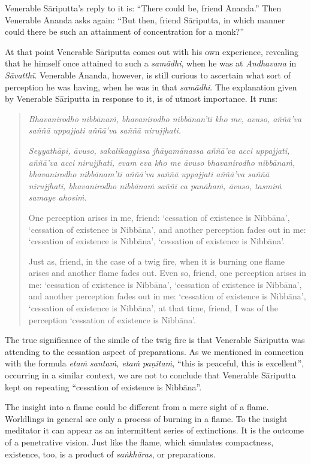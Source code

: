 Venerable Sāriputta's reply to it is: ``There could be, friend Ānanda.'' Then Venerable Ānanda asks again: ``But then, friend Sāriputta, in which manner could there be such an attainment of concentration for a monk?''

At that point Venerable Sāriputta comes out with his own experience, revealing that he himself once attained to such a \emph{samādhi}, when he was at \emph{Andhavana} in \emph{Sāvatthī}. Venerable Ānanda, however, is still curious to ascertain what sort of perception he was having, when he was in that \emph{samādhi}. The explanation given by Venerable Sāriputta in response to it, is of utmost importance. It runs:

\begin{quote}
\emph{Bhavanirodho nibbānaṁ, bhavanirodho nibbānan'ti kho me, avuso, aññā'va saññā uppajjati aññā'va saññā nirujjhati.}

\emph{Seyyathāpi, āvuso, sakalikaggissa jhāyamānassa aññā'va acci uppajjati, aññā'va acci nirujjhati, evam eva kho me āvuso bhavanirodho nibbānaṁ, bhavanirodho nibbānam'ti aññā'va saññā uppajjati aññā'va saññā nirujjhati, bhavanirodho nibbānaṁ saññī ca panāhaṁ, āvuso, tasmiṁ samaye ahosiṁ.}

One perception arises in me, friend: `cessation of existence is Nibbāna', `cessation of existence is Nibbāna', and another perception fades out in me: `cessation of existence is Nibbāna', `cessation of existence is Nibbāna'.

Just as, friend, in the case of a twig fire, when it is burning one flame arises and another flame fades out. Even so, friend, one perception arises in me: `cessation of existence is Nibbāna', `cessation of existence is Nibbāna', and another perception fades out in me: `cessation of existence is Nibbāna', `cessation of existence is Nibbāna', at that time, friend, I was of the perception `cessation of existence is Nibbāna'.
\end{quote}

The true significance of the simile of the twig fire is that Venerable Sāriputta was attending to the cessation aspect of preparations. As we mentioned in connection with the formula \emph{etaṁ santaṁ, etaṁ paṇītaṁ,} ``this is peaceful, this is excellent'', occurring in a similar context, we are not to conclude that Venerable Sāriputta kept on repeating ``cessation of existence is Nibbāna''.

The insight into a flame could be different from a mere sight of a flame. Worldlings in general see only a process of burning in a flame. To the insight meditator it can appear as an intermittent series of extinctions. It is the outcome of a penetrative vision. Just like the flame, which simulates compactness, existence, too, is a product of \emph{saṅkhāras}, or preparations.

